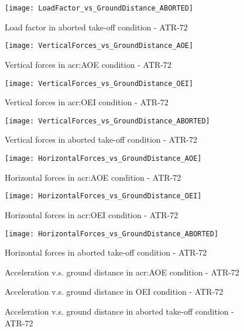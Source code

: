 %
\begin{figure}[H]
\centering
\texttt{[image: LoadFactor\_vs\_GroundDistance\_ABORTED]}
\caption{Load factor in aborted take-off condition - ATR-72}
\end{figure}
%
\begin{figure}[H]
\centering
\texttt{[image: VerticalForces\_vs\_GroundDistance\_AOE]}
\caption{Vertical forces in \gls{acr:AOE} condition - ATR-72}
\end{figure}
%
\begin{figure}[H]
\centering
\texttt{[image: VerticalForces\_vs\_GroundDistance\_OEI]}
\caption{Vertical forces in \gls{acr:OEI} condition - ATR-72}
\end{figure}
%
\begin{figure}[H]
\centering
\texttt{[image: VerticalForces\_vs\_GroundDistance\_ABORTED]}
\caption{Vertical forces in aborted take-off condition - ATR-72}
\end{figure}
%
\begin{figure}[H]
\centering
\texttt{[image: HorizontalForces\_vs\_GroundDistance\_AOE]}
\caption{Horizontal forces in \gls{acr:AOE} condition - ATR-72}
\end{figure}
%
\begin{figure}[H]
\centering
\texttt{[image: HorizontalForces\_vs\_GroundDistance\_OEI]}
\caption{Horizontal forces in \gls{acr:OEI} condition - ATR-72}
\end{figure}
%
\begin{figure}[H]
\centering
\texttt{[image: HorizontalForces\_vs\_GroundDistance\_ABORTED]}
\caption{Horizontal forces in aborted take-off condition - ATR-72}
\end{figure}
%
\begin{figure}[H]
\centering

\caption{Acceleration v.s. ground distance in \gls{acr:AOE} condition - ATR-72}
\end{figure}
%
\begin{figure}[H]
\centering

\caption{Acceleration v.s. ground distance in OEI condition - ATR-72}
\end{figure}
%
\begin{figure}[H]
\centering

\caption{Acceleration v.s. ground distance in aborted take-off condition - ATR-72}
\end{figure}
